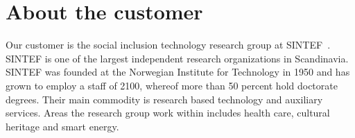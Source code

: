 \section{About the customer}

Our customer is the social inclusion technology research group at SINTEF~\cite{sintef}. SINTEF is one of the largest independent research organizations in Scandinavia. SINTEF was founded at the Norwegian Institute for Technology in 1950 and has grown to employ a staff of 2100, whereof more than 50 percent hold doctorate degrees. Their main commodity is research based technology and auxiliary services. Areas the research group work within includes health care, cultural heritage and smart energy.

